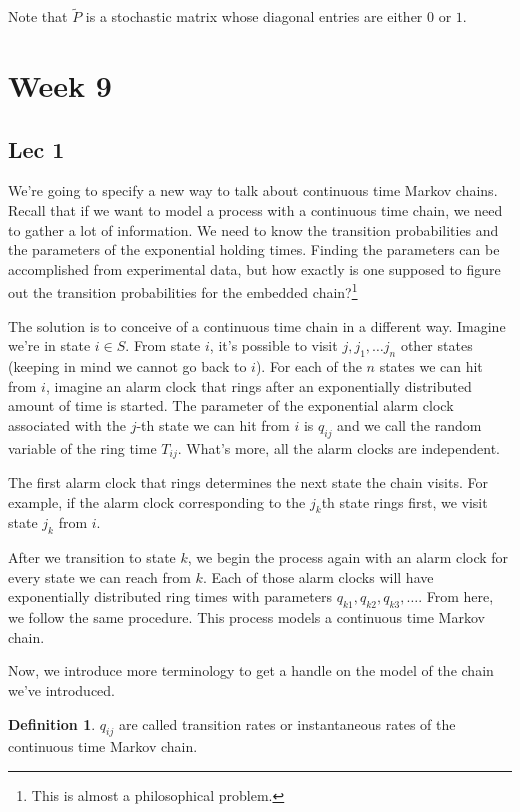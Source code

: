\documentclass[12pt]{article}
\theoremstyle{definition}
\newtheorem{definition}{Definition}[section]
\begin{document}
Note that $\widetilde{P}$ is a stochastic matrix whose diagonal entries are either $0$ or $1$.

\section{Week 9}
\subsection{Lec 1}

We're going to specify a new way to talk about continuous time Markov chains. Recall that if we want to model a process with a continuous time chain, we need to gather a lot of information. We need to know the transition probabilities and the parameters of the exponential holding times. Finding the parameters can be accomplished from experimental data, but how exactly is one supposed to figure out the transition probabilities for the embedded chain?\footnote{This is almost a philosophical problem.}

The solution is to conceive of a continuous time chain in a different way. Imagine we're in state $i \in S$. From state $i$, it's possible to visit $j, j_1, \dots j_n$ other states (keeping in mind we cannot go back to $i$). For each of the $n$ states we can hit from $i$, imagine an alarm clock that rings after an exponentially distributed amount of time is started. The parameter of the exponential alarm clock associated with the $j$-th state we can hit from $i$ is $q_{ij}$ and we call the random variable of the ring time $T_{ij}$. What's more, all the alarm clocks are independent.

The first alarm clock that rings determines the next state the chain visits. For example, if the alarm clock corresponding to the $j_k$th state rings first, we visit state $j_k$ from $i$.

After we transition to state $k$, we begin the process again with an alarm clock for every state we can reach from $k$. Each of those alarm clocks will have exponentially distributed ring times with parameters $q_{k1}, q_{k2}, q_{k3}, \dots$. From here, we follow the same procedure. This process models a continuous time Markov chain.

Now, we introduce more terminology to get a handle on the model of the chain we've introduced.

\begin{definition}
  $q_{ij}$ are called transition rates or instantaneous rates of the continuous time Markov chain.
\end{definition}
\end{document}
